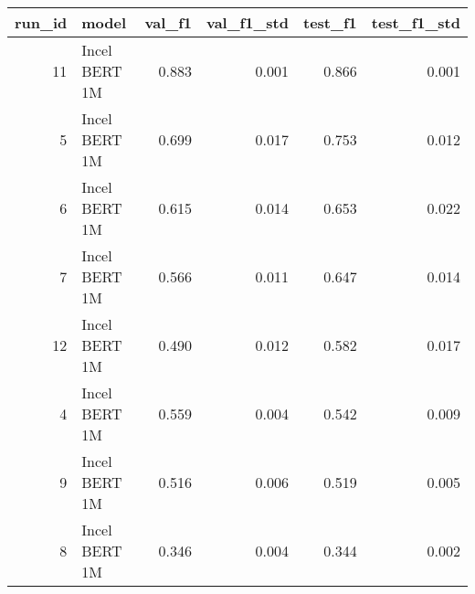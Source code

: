 \begin{tabular}{rlrrrr}
\toprule
 run\_id &         model &  val\_f1 &  val\_f1\_std &  test\_f1 &  test\_f1\_std \\
\midrule
     11 & Incel BERT 1M &   0.883 &       0.001 &    0.866 &        0.001 \\
      5 & Incel BERT 1M &   0.699 &       0.017 &    0.753 &        0.012 \\
      6 & Incel BERT 1M &   0.615 &       0.014 &    0.653 &        0.022 \\
      7 & Incel BERT 1M &   0.566 &       0.011 &    0.647 &        0.014 \\
     12 & Incel BERT 1M &   0.490 &       0.012 &    0.582 &        0.017 \\
      4 & Incel BERT 1M &   0.559 &       0.004 &    0.542 &        0.009 \\
      9 & Incel BERT 1M &   0.516 &       0.006 &    0.519 &        0.005 \\
      8 & Incel BERT 1M &   0.346 &       0.004 &    0.344 &        0.002 \\
\bottomrule
\end{tabular}
